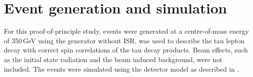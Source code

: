 






\section{Event generation and simulation}

For this proof-of-principle study, \eeZZQQ events were generated at a centre-of-mass energy of 350\,GeV using the \WHIZARD \cite{whizard} generator without ISR. \TAUOLA \cite{Jadach:1993hs} was used to describe the tau lepton decay with correct spin correlations of the tau decay products. Beam effects, such as the initial state radiation and the beam induced background, were not included. The \eeZZQQ events were simulated using the \ILD detector model as described in .




